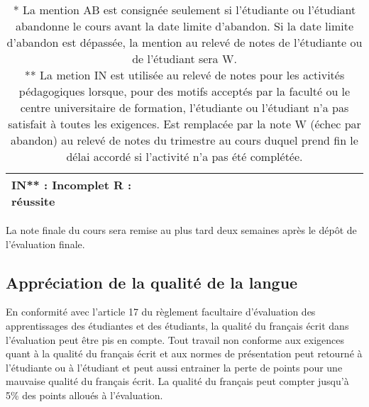 \documentclass[12]{article}
\begin{document}
\begin{center}
\begin{table}[h]
\begin{tabular}{| p{0.2\linewidth} | p{0.2\linewidth} | p{0.2\linewidth} | p{0.2\linewidth} | p{0.2\linewidth} | }
        \multicolumn{2}{l}{
            IN** : Incomplet\hfill\hfill \linebreak 
            R : réussite\hfill\hfill} \\
		\hline
		\end{tabular}
		\caption*{* La mention AB est consignée seulement si l’étudiante ou l’étudiant abandonne le cours avant la date
		limite d'abandon. Si la date limite d’abandon est dépassée, la mention au relevé de notes de l’étudiante
		ou de l’étudiant sera W.\\
		** La metion IN est utilisée au relevé de notes pour les activités
		pédagogiques lorsque, pour des motifs acceptés par la faculté ou le
		centre universitaire de formation, l’étudiante ou l’étudiant n’a pas
		satisfait à toutes les exigences. Est remplacée par la note W (échec
		par abandon) au relevé de notes du trimestre au cours duquel prend fin
		le délai accordé si l’activité n’a pas été complétée.}
		\end{table}
	\end{center}

    La note finale du cours sera remise au plus tard deux semaines après le
	dépôt de l'évaluation finale.

    \subsection*{Appréciation de la qualité de la langue}

    En conformité avec l'article 17 du règlement facultaire d'évaluation
    des apprentissages des étudiantes et des étudiants, la qualité du français
    écrit dans l’évaluation peut être pis en compte. Tout travail non conforme
    aux exigences quant à la qualité du français écrit et aux normes de
    présentation  peut retourné à l'étudiante ou à l'étudiant et peut aussi
    entrainer la perte de points pour une mauvaise qualité du français écrit.
    La qualité du français peut compter jusqu'à 5\% des points alloués à
    l'évaluation.

	
\end{document}
